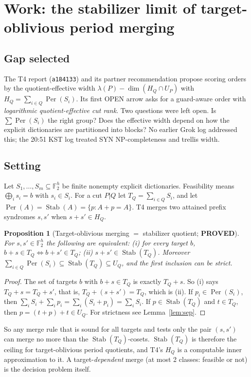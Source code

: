 \documentclass[11pt]{article}
\newtheorem{proposition}{Proposition}
\newcommand{\Per}{\operatorname{Per}}
\newcommand{\Stab}{\operatorname{Stab}}
\newcommand{\F}{\mathbb{F}_2}
\begin{document}
\section{Work: the stabilizer limit of target-oblivious period merging}
\subsection*{Gap selected}
The T4 report (\texttt{a184133}) and its partner recommendation propose scoring orders by the quotient-effective width
$\lambda(P)-\dim(H_Q\cap U_P)$ with $H_Q=\sum_{i\in Q}\Per(S_i)$. Its first OPEN arrow asks for a guard-aware order with \emph{logarithmic
quotient-effective cut rank}. Two questions were left open. Is $\sum\Per(S_i)$ the right group? Does the effective width depend on how the explicit
dictionaries are partitioned into blocks? No earlier Grok log addressed this; the 20:51 KST log treated SYN NP-completeness and trellis width.

\subsection*{Setting}
Let $S_1,\dots,S_m\subseteq\F^h$ be finite nonempty explicit dictionaries. Feasibility means $\bigoplus_i s_i=b$ with $s_i\in S_i$. For a cut $P|Q$ let
$T_Q=\sum_{i\in Q}S_i$, and let $\Per(A)=\Stab(A)=\{p: A+p=A\}$. T4 merges two attained prefix syndromes $s,s'$ when $s+s'\in H_Q$.

\begin{proposition}[Target-oblivious merging $=$ stabilizer quotient; \textbf{PROVED}]\label{prop:stab}
For $s,s'\in\F^h$ the following are equivalent:
(i) for every target $b$, $b+s\in T_Q \iff b+s'\in T_Q$;
(ii) $s+s'\in\Stab(T_Q)$.
Moreover $\sum_{i\in Q}\Per(S_i)\subseteq\Stab(T_Q)\subseteq U_Q$, and the first inclusion can be strict.
\end{proposition}
\begin{proof}
The set of targets $b$ with $b+s\in T_Q$ is exactly $T_Q+s$. So (i) says $T_Q+s=T_Q+s'$, that is, $T_Q+(s+s')=T_Q$, which is (ii).
If $p_i\in\Per(S_i)$, then $\sum_i S_i+\sum_i p_i=\sum_i(S_i+p_i)=\sum_iS_i$. If $p\in\Stab(T_Q)$ and $t\in T_Q$, then $p=(t+p)+t\in U_Q$.
For strictness see Lemma~\ref{lem:sep}.
\end{proof}
\noindent So any merge rule that is sound for all targets and tests only the pair $(s,s')$ can merge no more than the $\Stab(T_Q)$-cosets.
$\Stab(T_Q)$ is therefore the ceiling for target-oblivious period quotients, and T4's $H_Q$ is a computable inner approximation to it.
A target-\emph{dependent} merge (at most 2 classes: feasible or not) is the decision problem itself.
\end{document}
